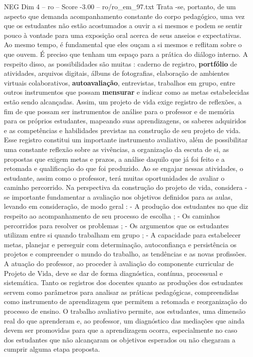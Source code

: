 \begin{textsample}{NEG Dim 4 – ro – Score -3.00 – ro/ro\_em\_97.txt}
Trata -se, portanto, de um aspecto que demanda acompanhamento constante do corpo pedagógico, uma vez que os estudantes não estão acostumados a ouvir a si mesmos e podem se sentir pouco à vontade para uma exposição oral acerca de seus anseios e expectativas.
Ao mesmo tempo, é fundamental que eles ouçam a si mesmos e reflitam sobre o que ouvem.
É preciso que tenham um espaço para a prática do diálogo interno.
A respeito disso, as possibilidades são muitas : caderno de registro, \textbf{portfólio} de atividades, arquivos digitais, álbuns de fotografias, elaboração de ambientes virtuais colaborativos, \textbf{autoavaliação}, entrevistas, trabalhos em grupo, entre outros instrumentos que possam \textbf{mensurar} e indicar como as metas estabelecidas estão sendo alcançadas.
Assim, um projeto de vida exige registro de reflexões, a fim de que possam ser instrumentos de análise para o professor e de memória para os próprios estudantes, mapeando suas aprendizagens, os saberes adquiridos e as competências e habilidades previstas na construção de seu projeto de vida.
Esse registro constitui um importante instrumento avaliativo, além de possibilitar uma constante reflexão sobre as vivências, a organização da escuta de si, as propostas que exigem metas e prazos, a análise daquilo que já foi feito e a retomada e qualificação do que foi produzido.
Ao se engajar nessas atividades, o estudante, assim como o professor, terá muitas oportunidades de avaliar o caminho percorrido.
Na perspectiva da construção do projeto de vida, considera -se importante fundamentar a avaliação nos objetivos definidos para as aulas, levando em consideração, de modo geral : - A produção dos estudantes no que diz respeito ao acompanhamento de seu processo de escolha ; - Os caminhos percorridos para resolver os problemas ; - Os argumentos que os estudantes utilizam entre si quando trabalham em grupo ; - A capacidade para estabelecer metas, planejar e perseguir com determinação, autoconfiança e persistência os projetos e compreender o mundo do trabalho, as tendências e as novas profissões.
A atuação do professor, ao proceder à avaliação do componente curricular de Projeto de Vida, deve se dar de forma diagnóstica, contínua, processual e sistemática.
Tanto os registros dos docentes quanto as produções dos estudantes servem como parâmetros para analisar as práticas pedagógicas, compreendidas como instrumento de aprendizagem que permitem a retomada e reorganização do processo de ensino.
O trabalho avaliativo permite, aos estudantes, uma dimensão real do que aprenderam e, ao professor, um diagnóstico das mediações que ainda devem ser promovidas para que a aprendizagem ocorra, especialmente no caso dos estudantes que não alcançaram os objetivos esperados ou não chegaram a cumprir alguma etapa proposta.

\end{textsample}
